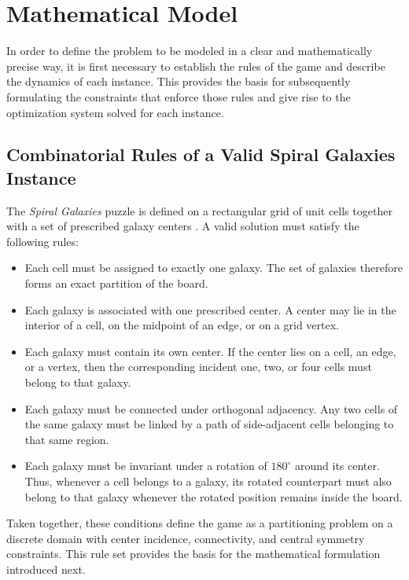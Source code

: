 \section{Mathematical Model}

In order to define the problem to be modeled in a clear and mathematically precise way, it is first necessary to establish the rules of the game and describe the dynamics of each instance. This provides the basis for subsequently formulating the constraints that enforce those rules and give rise to the optimization system solved for each instance.

\subsection{Combinatorial Rules of a Valid Spiral Galaxies Instance}

The \textit{Spiral Galaxies} puzzle is defined on a rectangular grid of unit
cells together with a set of prescribed galaxy centers \cite{fertin2015}. A
valid solution must satisfy the following rules:

\begin{itemize}
\item Each cell must be assigned to exactly one galaxy. The set of galaxies
therefore forms an exact partition of the board.

\item Each galaxy is associated with one prescribed center. A center may lie in
the interior of a cell, on the midpoint of an edge, or on a grid vertex.

\item Each galaxy must contain its own center. If the center lies on a cell, an
edge, or a vertex, then the corresponding incident one, two, or four cells must
belong to that galaxy.

\item Each galaxy must be connected under orthogonal adjacency. Any two cells
of the same galaxy must be linked by a path of side-adjacent cells belonging to
that same region.

\item Each galaxy must be invariant under a rotation of $180^\circ$ around its
center. Thus, whenever a cell belongs to a galaxy, its rotated counterpart must
also belong to that galaxy whenever the rotated position remains inside the
board.
\end{itemize}

Taken together, these conditions define the game as a partitioning problem on a
discrete domain with center incidence, connectivity, and central symmetry
constraints. This rule set provides the basis for the mathematical formulation
introduced next.

